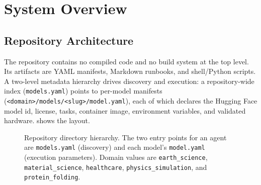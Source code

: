\documentclass[11pt]{article}
\newcommand{\code}[1]{\texttt{#1}}
\newcommand{\file}[1]{\texttt{\small #1}}
\begin{document}
\section{System Overview}
\label{sec:overview}

\subsection{Repository Architecture}
The repository contains no compiled code and no build system at the top level.
Its artifacts are YAML manifests, Markdown runbooks, and shell/Python scripts.
A two-level metadata hierarchy drives discovery and execution: a repository-wide
index (\file{models.yaml}) points to per-model manifests
(\file{<domain>/models/<slug>/model.yaml}), each of which declares the Hugging
Face model id, license, tasks, container image, environment variables, and
validated hardware.  shows the layout.

\begin{figure}[ht]
\centering
{}
\caption{Repository directory hierarchy. The two entry points for an agent are
\file{models.yaml} (discovery) and each model's \file{model.yaml} (execution
parameters). Domain values are \code{earth\_science}, \code{material\_science},
\code{healthcare}, \code{physics\_simulation}, and \code{protein\_folding}.}
\label{fig:tree}
\end{figure}
\end{document}
